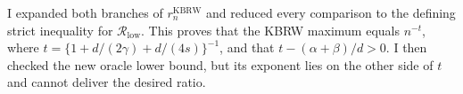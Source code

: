 I expanded both branches of \(r_n^{\mathrm{KBRW}}\) and reduced every comparison to the defining strict inequality for \(\mathcal R_{\mathrm{low}}\).  This proves that the KBRW maximum equals \(n^{-t}\), where \(t=\{1+d/(2\gamma)+d/(4s)\}^{-1}\), and that \(t-(\alpha+\beta)/d>0\).  I then checked the new oracle lower bound, but its exponent lies on the other side of \(t\) and cannot deliver the desired ratio.